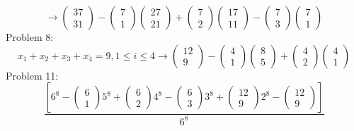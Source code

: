 \documentclass{article}
\begin{document}
$$
\rightarrow
\left(\begin{array}{c}
37\\
31
\end{array}\right)
-
\left(\begin{array}{c}
7\\
1
\end{array}\right)
\left(\begin{array}{c}
27\\
21
\end{array}\right)
+
\left(\begin{array}{c}
7\\
2
\end{array}\right)
\left(\begin{array}{c}
17\\
11
\end{array}\right)
-
\left(\begin{array}{c}
7\\
3
\end{array}\right)
\left(\begin{array}{c}
7\\
1
\end{array}\right)
$$
Problem 8:
$$
x_1+x_2+x_3+x_4=9,1\leq i \leq 4
\rightarrow
\left(\begin{array}{c}
12\\
9
\end{array}\right)
-
\left(\begin{array}{c}
4\\
1
\end{array}\right)
\left(\begin{array}{c}
8\\
5
\end{array}\right)
+
\left(\begin{array}{c}
4\\
2
\end{array}\right)
\left(\begin{array}{c}
4\\
1
\end{array}\right)
$$
Problem 11:
$$
\frac{[6^8
-
\left(\begin{array}{c}
6\\
1
\end{array}\right)
5^8
+
\left(\begin{array}{c}
6\\
2
\end{array}\right)
4^8
-
\left(\begin{array}{c}
6\\
3
\end{array}\right)
3^8
+
\left(\begin{array}{c}
12\\
9
\end{array}\right)
2^8
-
\left(\begin{array}{c}
12\\
9
\end{array}\right)]}
{6^8}
$$
\end{document}
